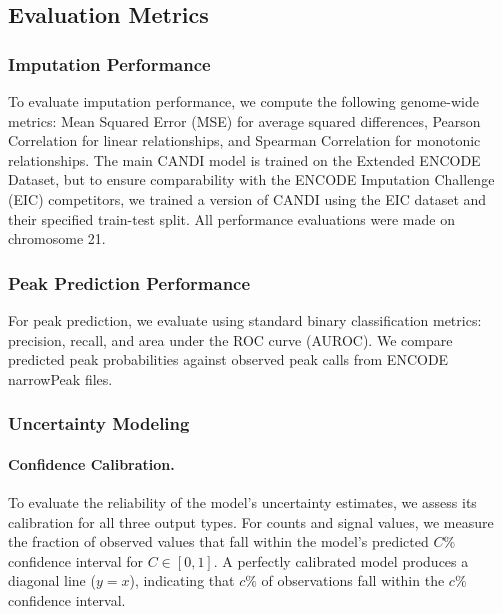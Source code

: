 \subsection{Evaluation Metrics}

\subsubsection{Imputation Performance}

To evaluate imputation performance, we compute the following genome-wide metrics: Mean Squared Error (MSE) for average squared differences, Pearson Correlation for linear relationships, and Spearman Correlation for monotonic relationships. The main CANDI model is trained on the Extended ENCODE Dataset, but to ensure comparability with the ENCODE Imputation Challenge (EIC) competitors, we trained a version of CANDI using the EIC dataset and their specified train-test split. All performance evaluations were made on chromosome 21.

\subsubsection{Peak Prediction Performance}

For peak prediction, we evaluate using standard binary classification metrics: precision, recall, and area under the ROC curve (AUROC). We compare predicted peak probabilities against observed peak calls from ENCODE narrowPeak files.

\subsubsection{Uncertainty Modeling}

\paragraph{Confidence Calibration.}
To evaluate the reliability of the model's uncertainty estimates, we assess its calibration for all three output types. For counts and signal values, we measure the fraction of observed values that fall within the model's predicted $C\%$ confidence interval for $C \in [0, 1]$. A perfectly calibrated model produces a diagonal line ($y = x$), indicating that $c\%$ of observations fall within the $c\%$ confidence interval.


